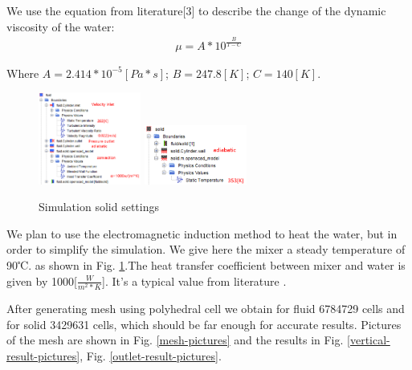\documentclass[journal,article,submit,moreauthors,pdftex]{Definitions/mdpi}
\begin{document}
We use the equation from literature[3] to describe the change of the dynamic viscosity of the water: 
\begin{align*}
    \mu=A*10^{\frac{B}{T-C}}
\end{align*}

Where $A=2.414*10^{-5}[Pa*s]$; $B=247.8[K]$; $C=140[K]$.

\begin{figure}
\begin{center}
\centerline{\includegraphics[width=0.3\textwidth]{./docu_pictures/solid1.png} \includegraphics[width=0.3\textwidth]{./docu_pictures/solid2.png}}
\end{center}
\caption{Simulation solid settings}
\label{solid-settings}
\end{figure}

We plan to use the electromagnetic induction method to heat the water, but in order to simplify the simulation. We give here the mixer a steady temperature of 90℃. as shown in  Fig. \ref{solid-settings}.The heat transfer coefficient between mixer and water is given by 1000[$\frac{W}{m^{2}*K}$]. It's a typical value from literature \cite{uebergang-fluessigkeit}. 

After generating mesh using polyhedral cell we obtain for fluid 6784729 cells and for solid 3429631 cells, which should be far enough for accurate results. Pictures of the mesh are shown in Fig. \ref{mesh-pictures} and the results in Fig. \ref{vertical-result-pictures}, Fig. \ref{outlet-result-pictures}.
\end{document}
